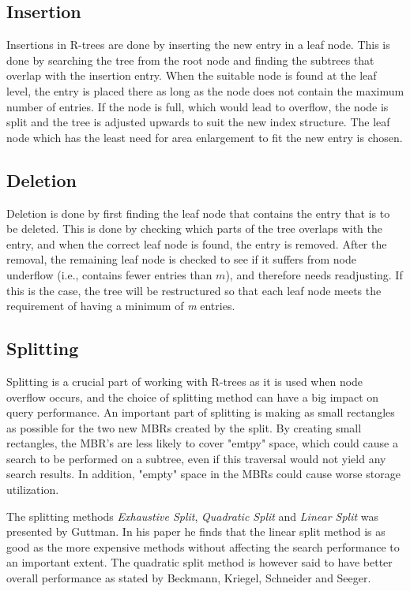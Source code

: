 \subsection{Insertion}
Insertions in R-trees are done by inserting the new entry in a leaf node. This is done by searching the tree from the root node and finding the subtrees that overlap with the insertion entry. When the suitable node is found at the leaf level, the entry is placed there as long as the node does not contain the maximum number of entries. If the node is full, which would lead to overflow, the node is split and the tree is adjusted upwards to suit the new index structure. The leaf node which has the least need for area enlargement to fit the new entry is chosen.

\subsection{Deletion}
Deletion is done by first finding the leaf node that contains the entry that is to be deleted. This is done by checking which parts of the tree overlaps with the entry, and when the correct leaf node is found, the entry is removed. After the removal, the remaining leaf node is checked to see if it suffers from node underflow (i.e., contains fewer entries than $m$), and therefore needs readjusting. If this is the case, the tree will be restructured so that each leaf node meets the requirement of having a minimum of \emph{m} entries. 

\subsection{Splitting}
Splitting is a crucial part of working with R-trees as it is used when node overflow occurs, and the choice of splitting method can have a big impact on query performance. An important part of splitting is making as small rectangles as possible for the two new MBRs created by the split. By creating small rectangles, the MBR's are less likely to cover "emtpy" space, which could cause a search to be performed on a subtree, even if this traversal would not yield any search results. In addition, "empty" space in the MBRs could cause worse storage utilization.\newline

\noindent
The splitting methods \emph{Exhaustive Split}, \emph{Quadratic Split} and \emph{Linear Split} was presented by Guttman\cite{r-tree}. In his paper he finds that the linear split method is as good as the more expensive methods without affecting the search performance to an important extent. The quadratic split method is however said to have better overall performance as stated by Beckmann, Kriegel, Schneider and Seeger\cite{R*-tree}.

